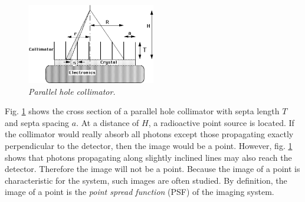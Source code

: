 \documentclass[11pt,oneside]{article}
\begin{document}
\begin{figure}[tb]
\centering
\includegraphics[width=0.5\textwidth]{figs/fig_collimator_calc.pdf}
\caption{\emph{Parallel hole collimator.}}
\label{fig:collimator_calc}
\end{figure}

Fig. \ref{fig:collimator_calc} shows the cross section of a parallel
hole collimator with septa length $T$ and septa spacing $a$. At a
distance of $H$, a radioactive point source is located.  If the
collimator would really absorb all photons except those propagating
exactly perpendicular to the detector, then the image would be a
point.  However, fig. \ref{fig:collimator_calc} shows that photons
propagating along slightly inclined lines may also reach the detector.
Therefore the image will not be a point. Because the image of a point
is characteristic for the system, such images are often studied. By
definition, the image of a point is the {\em point spread function}
(PSF) of the imaging system. 
\end{document}
